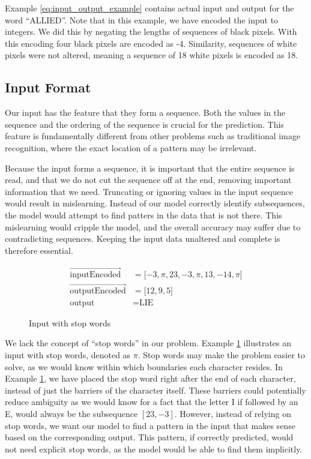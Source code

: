 Example \ref{eq:input_output_example} contains actual input and output for the word ``ALLIED''. Note that in this example, we have encoded the input to integers. We did this by negating the lengths of sequences of black pixels. With this encoding four black pixels are encoded as -4. Similarity, sequences of white pixels were not altered, meaning a sequence of 18 white pixels is encoded as 18.

\subsection{Input Format}
Our input has the feature that they form a sequence. Both the values in the sequence and the ordering of the sequence is crucial for the prediction. This feature is fundamentally different from other problems such as traditional image recognition, where the exact location of a pattern may be irrelevant.

Because the input forms a sequence, it is important that the entire sequence is read, and that we do not cut the sequence off at the end, removing important information that we need. Truncating or ignoring values in the input sequence would result in mislearning. Instead of our model correctly identify subsequences, the model would attempt to find patters in the data that is not there. This mislearning would cripple the model, and the overall accuracy may suffer due to contradicting sequences. Keeping the input data unaltered and complete is therefore essential.

\begin{figure}[h]
    \renewcommand\figurename{Example}
    \begin{equation*}
        \begin{aligned}
           \vec{\text{inputEncoded}}                &= \lbrack -3, \pi, 23, -3, \pi, 13, -14, \pi \rbrack \\
           \vec{\text{outputEncoded}}               &= \lbrack 12, 9, 5 \rbrack \\
           \text{output}                            &= \text{LIE}
        \end{aligned}
    \end{equation*}
    \caption{Input with stop words}
    \label{eq:input_stop_words}
\end{figure}

We lack the concept of ``stop words'' in our problem. Example \ref{eq:input_stop_words} illustrates an input with stop words, denoted as $\pi$. Stop words may make the problem easier to solve, as we would know within which boundaries each character resides. In Example \ref{eq:input_stop_words}, we have placed the stop word right after the end of each character, instead of just the barriers of the character itself. These barriers could potentially reduce ambiguity as we would know for a fact that the letter I if followed by an E, would always be the subsequence \([23, -3]\). However, instead of relying on stop words, we want our model to find a pattern in the input that makes sense based on the corresponding output. This pattern, if correctly predicted, would not need explicit stop words, as the model would be able to find them implicitly.

